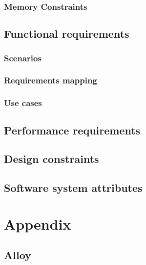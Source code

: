 \documentclass[a4paper,oneside,11pt]{article}
\begin{document}
            \subsubsection{Memory Constraints}
                
            
        \subsection{Functional requirements}
            
        \subsubsection{Scenarios}
            
            
        \subsubsection{Requirements mapping}
            
         \newpage
         
        \subsubsection{Use cases}
            
       \newpage  
        \subsection{Performance requirements}
            
         \newpage    
        \subsection{Design constraints}
            
         \newpage
        \subsection{Software system attributes}
            
        \newpage
        
        \section{Appendix}
            \subsection{Alloy}
                
\end{document}
